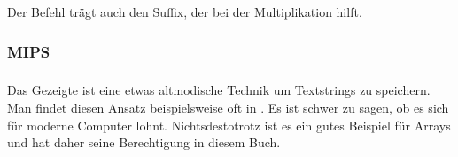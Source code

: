 Der \ADD Befehl trägt auch den \LSL Suffix, der bei der Multiplikation hilft.

\subsubsection{MIPS}


\subsubsection{\Conclusion{}}
Das Gezeigte ist eine etwas altmodische Technik um Textstrings zu speichern.
Man findet diesen Ansatz beispielsweise oft in \orcale.
Es ist schwer zu sagen, ob es sich für moderne Computer lohnt.
Nichtsdestotrotz ist es ein gutes Beispiel für Arrays und hat daher seine Berechtigung in diesem Buch.

